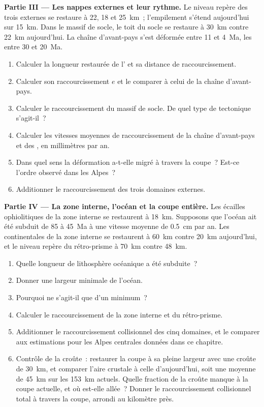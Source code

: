 \begin{problem}
\noindent\textbf{Partie III --- Les nappes externes et leur rythme.} Le niveau repère des trois
 externes se restaure à 22, 18 et \qty{25}{km}~; l'empilement s'étend aujourd'hui sur
\qty{15}{km}. Dans le massif de socle, le toit du socle se restaure à \qty{30}{km}
contre \qty{22}{km} aujourd'hui. La chaîne d'avant-pays s'est déformée entre 11 et \qty{4}{Ma}, les
 entre 30 et \qty{20}{Ma}.
\begin{enumerate}[resume]
\item Calculer la longueur restaurée de l' et sa distance de raccourcissement.
\item Calculer son raccourcissement $e$ et le comparer à celui de la chaîne d'avant-pays.
\item Calculer le raccourcissement du massif de socle. De quel type de tectonique s'agit-il~?
\item Calculer les vitesses moyennes de raccourcissement de la chaîne d'avant-pays et des , en
millimètres par an.
\item Dans quel sens la déformation a-t-elle migré à travers la coupe~? Est-ce l'ordre
observé dans les Alpes~?
\item Additionner le raccourcissement des trois domaines externes.
\end{enumerate}

\noindent\textbf{Partie IV --- La zone interne, l'océan et la coupe entière.}
Les écailles ophiolitiques de la zone interne se restaurent à \qty{18}{km}. Supposons que l'océan ait été
subduit de 85 à \qty{45}{Ma} à une vitesse moyenne de \qty{0.5}{cm} par an. Les 
continentales de la zone interne se restaurent à \qty{60}{km} contre \qty{20}{km} aujourd'hui, et le
niveau repère du rétro-prisme à \qty{70}{km} contre \qty{48}{km}.
\begin{enumerate}[resume]
\item Quelle longueur de lithosphère océanique a été subduite~?
\item Donner une largeur minimale de l'océan.
\item Pourquoi ne s'agit-il que d'un minimum~?
\item Calculer le raccourcissement de la zone interne et du rétro-prisme.
\item Additionner le raccourcissement collisionnel des cinq domaines, et le comparer aux
estimations pour les Alpes centrales données dans ce chapitre.
\item Contrôle de la croûte~: restaurer la coupe à sa pleine largeur avec une croûte de \qty{30}{km}, et
comparer l'aire crustale à celle d'aujourd'hui, soit une moyenne de \qty{45}{km} sur les
\qty{153}{km} actuels. Quelle fraction de la croûte manque à la coupe actuelle, et où est-elle allée~? Donner le
raccourcissement collisionnel total à travers la coupe, arrondi au
kilomètre près.
\end{enumerate}
\end{problem}
